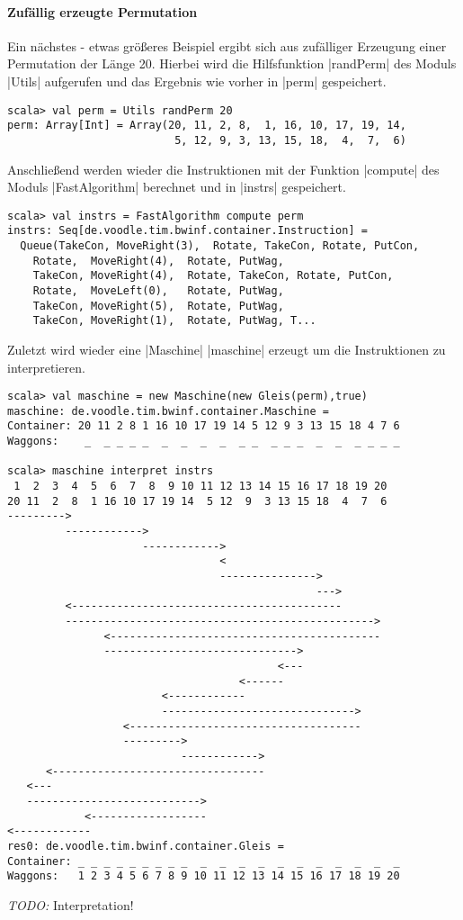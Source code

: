 \paragraph{Zufällig erzeugte Permutation}
Ein nächstes - etwas größeres Beispiel ergibt sich aus zufälliger Erzeugung einer Permutation der Länge 20.
Hierbei wird die Hilfsfunktion |randPerm| des Moduls |Utils| aufgerufen und das Ergebnis wie vorher in |perm| gespeichert.
\begin{lstlisting}
scala> val perm = Utils randPerm 20
perm: Array[Int] = Array(20, 11, 2, 8,  1, 16, 10, 17, 19, 14,
                          5, 12, 9, 3, 13, 15, 18,  4,  7,  6)
\end{lstlisting}
Anschließend werden wieder die Instruktionen mit der Funktion |compute| des Moduls |FastAlgorithm| berechnet und in |instrs| gespeichert.
\begin{lstlisting}
scala> val instrs = FastAlgorithm compute perm
instrs: Seq[de.voodle.tim.bwinf.container.Instruction] =
  Queue(TakeCon, MoveRight(3),  Rotate, TakeCon, Rotate, PutCon,
	Rotate,  MoveRight(4),  Rotate, PutWag,
	TakeCon, MoveRight(4),  Rotate, TakeCon, Rotate, PutCon,
	Rotate,  MoveLeft(0),   Rotate, PutWag,
	TakeCon, MoveRight(5),  Rotate, PutWag,
	TakeCon, MoveRight(1),  Rotate, PutWag, T...
\end{lstlisting}
Zuletzt wird wieder eine |Maschine| |maschine| erzeugt um die Instruktionen zu interpretieren.
\begin{lstlisting}
scala> val maschine = new Maschine(new Gleis(perm),true)      
maschine: de.voodle.tim.bwinf.container.Maschine = 
Container: 20 11 2 8 1 16 10 17 19 14 5 12 9 3 13 15 18 4 7 6
Waggons:    _  _ _ _ _  _  _  _  _  _ _  _ _ _  _  _  _ _ _ _

scala> maschine interpret instrs
 1  2  3  4  5  6  7  8  9 10 11 12 13 14 15 16 17 18 19 20
20 11  2  8  1 16 10 17 19 14  5 12  9  3 13 15 18  4  7  6
--------->
         ------------>
                     ------------>
                                 <
                                 --------------->
                                                --->
         <------------------------------------------
         ------------------------------------------------>
               <------------------------------------------
               ------------------------------>
                                          <---
                                    <------
                        <------------
                        ------------------------------>
                  <------------------------------------
                  --------->
                           ------------>
      <---------------------------------
   <---
   --------------------------->
            <------------------
<------------
res0: de.voodle.tim.bwinf.container.Gleis = 
Container: _ _ _ _ _ _ _ _ _  _  _  _  _  _  _  _  _  _  _  _
Waggons:   1 2 3 4 5 6 7 8 9 10 11 12 13 14 15 16 17 18 19 20
\end{lstlisting}
\emph{TODO:} Interpretation!
